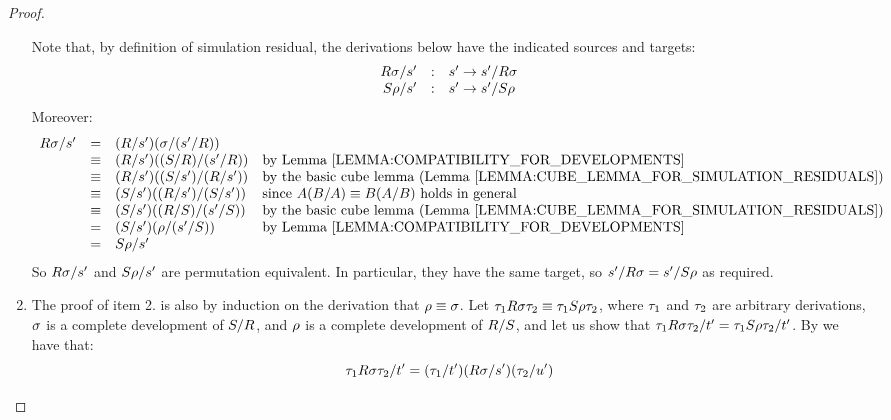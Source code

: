 \begin{proof}
\begin{pabloenv}
\begin{enumerate}
\[  \]
  Note that, by definition of simulation residual, the derivations below have the indicated sources and targets:
  \[
    \begin{array}{rcl}
    R\sigma/s' & : & s' \to s'/R\sigma \\
    S\rho/s' & : & s' \to s'/S\rho \\
    \end{array}
  \]
  Moreover:
  \[
    \begin{array}{rcll}
      \redex\redseqtwo/\tmtwo'
    & = & (\redex/\tmtwo')(\redseqtwo/(\tmtwo'/\redex)) \\
    & \permeq & (\redex/\tmtwo')((\redextwo/\redex)/(\tmtwo'/\redex))     & \text{by \rlem{compatibility_for_developments}} \\
    & \permeq & (\redex/\tmtwo')((\redextwo/\tmtwo')/(\redex/\tmtwo'))    & \text{by the basic cube lemma~(\rlem{cube_lemma_for_simulation_residuals})} \\
    & \permeq & (\redextwo/\tmtwo')((\redex/\tmtwo')/(\redextwo/\tmtwo')) & \text{since $A(B/A) \permeq B(A/B)$ holds in general} \\
    & \permeq & (\redextwo/\tmtwo')((\redex/\redextwo)/(\tmtwo'/\redextwo)) & \text{by the basic cube lemma~(\rlem{cube_lemma_for_simulation_residuals})} \\
    & = & (\redextwo/\tmtwo')(\redseq/(\tmtwo'/\redextwo)) & \text{by \rlem{compatibility_for_developments}} \\
    & = & \redextwo\redseq/\tmtwo'
    \end{array}
  \]
  So $R\sigma/s'$ and $S\rho/s'$ are permutation equivalent.
  In particular, they have the same target, so
  $s'/R\sigma = s'/S\rho$ as required.
\item
  The proof of item 2. is also by induction on the derivation that $\rho \equiv \sigma$.
  Let $\tau_1 R \sigma \tau_2 \equiv \tau_1 S \rho \tau_2$,
  where
  $\tau_1$ and $\tau_2$ are arbitrary derivations,
  $\sigma$ is a complete development of $S/R$,
  and $\rho$ is a complete development of $R/S$,
  and let us show that $\tau_1 R \sigma \tau_2/t' = \tau_1 S \rho \tau_2/t'$.
  By  we have that:
  \[
    \tau_1 R \sigma \tau_2/t' = (\tau_1/t') (R \sigma/s') (\tau_2/u')
\]
\end{enumerate}
\end{pabloenv}
\end{proof}
